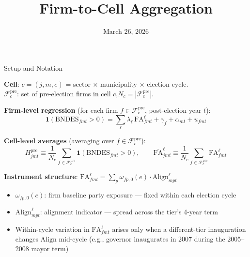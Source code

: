 \documentclass[aspectratio=169,11pt]{beamer}
\title{Firm-to-Cell Aggregation}
\author{}
\date{March 26, 2026}
\newcommand{\Align}{\mathrm{Align}}
\newcommand{\FA}{\mathrm{FA}}
\newcommand{\ind}{\mathbf{1}}
\newcommand{\cFpre}{\mathcal{F}^{\mathrm{pre}}}
\begin{document}
\begin{frame}
\titlepage
\end{frame}

\begin{frame}{Setup and Notation}

\footnotesize
\textbf{Cell}: $c = (j, m, e)$ = sector $\times$ municipality $\times$ election cycle.\\
$\cFpre_c$: set of pre-election firms in cell $c$,\quad $N_c = |\cFpre_c|$.

\medskip
\textbf{Firm-level regression} (for each firm $f \in \cFpre_c$, post-election year $t$):
\begin{equation}\label{eq:firm}
  \ind(\text{BNDES}_{fmt} > 0)
  = \sum_\ell \lambda_\ell\, \FA^\ell_{fmt}
  + \gamma_f + \alpha_{mt} + u_{fmt}
\end{equation}

\medskip
\textbf{Cell-level averages} (averaging over $f \in \cFpre_c$):
\[
  H^\mathrm{pre}_{jmt}
  \equiv \frac{1}{N_c}\sum_{f\in\cFpre_c} \ind(\text{BNDES}_{fmt}>0),
  \qquad
  \overline{\FA}^{\ell}_{jmt}
  \equiv \frac{1}{N_c}\sum_{f\in\cFpre_c} \FA^\ell_{fmt}
\]

\medskip
\textbf{Instrument structure}: $\FA^\ell_{fmt} = \sum_p \omega_{fp,0}(e) \cdot \Align^\ell_{mpt}$

\begin{itemize}\setlength{\itemsep}{2pt}
  \item $\omega_{fp,0}(e)$: firm baseline party exposure --- fixed within each election cycle
  \item $\Align^\ell_{mpt}$: alignment indicator --- spread across the tier's 4-year term
  \item Within-cycle variation in $\FA^\ell_{fmt}$ arises only when a different-tier
        inauguration changes $\Align$ mid-cycle (e.g., governor inaugurates in 2007
        during the 2005--2008 mayor term)
\end{itemize}

\end{frame}
\end{document}

